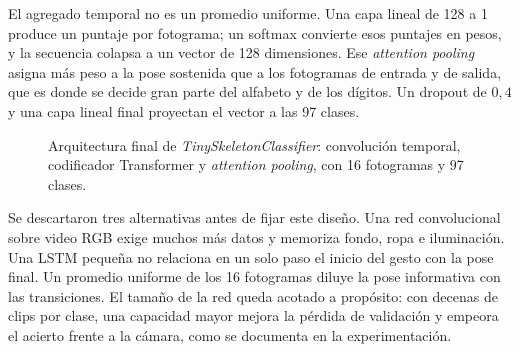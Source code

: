 El agregado temporal no es un promedio uniforme. Una capa lineal de 128 a 1 produce un puntaje por fotograma; un softmax convierte esos puntajes en pesos, y la secuencia colapsa a un vector de 128 dimensiones. Ese \textit{attention pooling} asigna más peso a la pose sostenida que a los fotogramas de entrada y de salida, que es donde se decide gran parte del alfabeto y de los dígitos. Un dropout de $0{,}4$ y una capa lineal final proyectan el vector a las 97 clases.

\begin{figure}[H]
    \centering
    \caption{Arquitectura final de \textit{TinySkeletonClassifier}: convolución temporal, codificador Transformer y \textit{attention pooling}, con 16 fotogramas y 97 clases.}
    \label{fig:tinyskeleton}
\end{figure}

Se descartaron tres alternativas antes de fijar este diseño. Una red convolucional sobre video RGB exige muchos más datos y memoriza fondo, ropa e iluminación. Una LSTM pequeña no relaciona en un solo paso el inicio del gesto con la pose final. Un promedio uniforme de los 16 fotogramas diluye la pose informativa con las transiciones. El tamaño de la red queda acotado a propósito: con decenas de clips por clase, una capacidad mayor mejora la pérdida de validación y empeora el acierto frente a la cámara, como se documenta en la experimentación.

